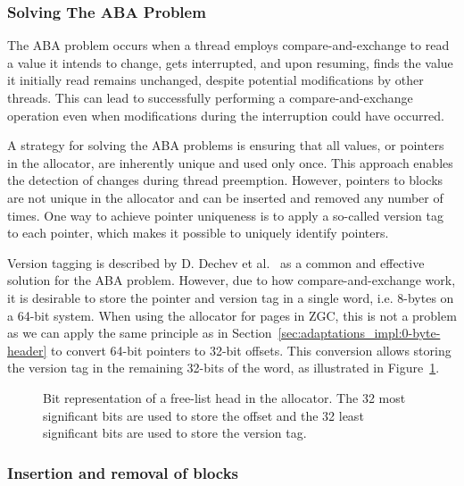 \subsubsection{Solving The ABA Problem}
\label{sec:adaptations_impl:aba_problem}

The ABA problem occurs when a thread employs compare-and-exchange to read a value it intends to change, gets interrupted, and upon resuming, finds the value it initially read remains unchanged, despite potential modifications by other threads. This can lead to successfully performing a compare-and-exchange operation even when modifications during the interruption could have occurred.

A strategy for solving the ABA problems is ensuring that all values, or pointers in the allocator, are inherently unique and used only once. This approach enables the detection of changes during thread preemption. However, pointers to blocks are not unique in the allocator and can be inserted and removed any number of times. One way to achieve pointer uniqueness is to apply a so-called version tag to each pointer, which makes it possible to uniquely identify pointers.

Version tagging is described by D. Dechev et al.~\cite{bjarne_aba} as a common and effective solution for the ABA problem. However, due to how compare-and-exchange work, it is desirable to store the pointer and version tag in a single word, i.e. 8-bytes on a 64-bit system. When using the allocator for pages in ZGC, this is not a problem as we can apply the same principle as in Section~\ref{sec:adaptations_impl:0-byte-header} to convert 64-bit pointers to 32-bit offsets. This conversion allows storing the version tag in the remaining 32-bits of the word, as illustrated in Figure~\ref{fig:concurrent_head_bits}.

\begin{figure}[H]
    \centering
    \vspace*{4mm}
    
    \caption{Bit representation of a free-list head in the allocator. The 32 most significant bits are used to store the offset and the 32 least significant bits are used to store the version tag.}
    \label{fig:concurrent_head_bits}
\end{figure}

\subsubsection{Insertion and removal of blocks}

